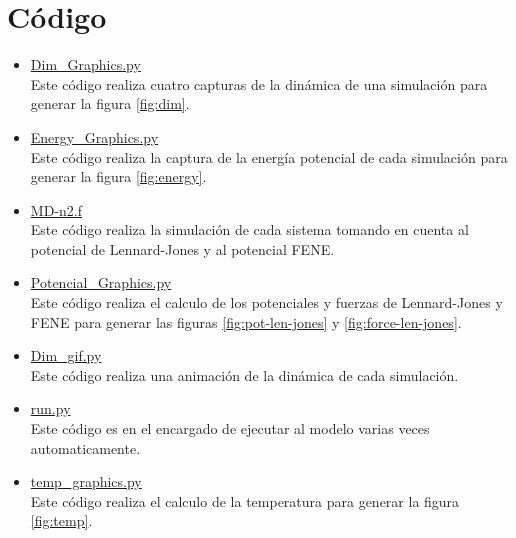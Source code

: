 \section{Código}
\begin{itemize}
    \item \href{https://github.com/giovannilopez9808/Notas_Agosto_2020/blob/master/Simulaciones/Proyecto_4/Scripts/Dim_Graphics.py}{Dim\_Graphics.py}\\
    Este código realiza cuatro capturas de la dinámica de una simulación para generar la figura \ref{fig:dim}.
    \item \href{https://github.com/giovannilopez9808/Notas_Agosto_2020/blob/master/Simulaciones/Proyecto_4/Scripts/Energy_Graphics.py}{Energy\_Graphics.py}\\
    Este código realiza la captura de la energía potencial de cada simulación para generar la figura \ref{fig:energy}.
    \item \href{https://github.com/giovannilopez9808/Notas_Agosto_2020/blob/master/Simulaciones/Proyecto_4/Scripts/MD-n2.f}{MD-n2.f}\\
    Este código realiza la simulación de cada sistema tomando en cuenta al potencial de Lennard-Jones y al potencial FENE.
    \item \href{https://github.com/giovannilopez9808/Notas_Agosto_2020/blob/master/Simulaciones/Proyecto_4/Scripts/Potencial_Graphics.py}{Potencial\_Graphics.py}\\
    Este código realiza el calculo de los potenciales y fuerzas de Lennard-Jones y FENE para generar las figuras \ref{fig:pot-len-jones} y \ref{fig:force-len-jones}.
    \item \href{https://github.com/giovannilopez9808/Notas_Agosto_2020/blob/master/Simulaciones/Proyecto_4/Scripts/dim_gif.py}{Dim\_gif.py}\\
    Este código realiza una animación de la dinámica de cada simulación.
    \item \href{https://github.com/giovannilopez9808/Notas_Agosto_2020/blob/master/Simulaciones/Proyecto_4/Scripts/run.py}{run.py}\\
    Este código es en el encargado de ejecutar al modelo varias veces automaticamente.
    \item \href{https://github.com/giovannilopez9808/Notas_Agosto_2020/blob/master/Simulaciones/Proyecto_4/Scripts/temp_graphics.py}{temp\_graphics.py}\\
    Este código realiza el calculo de la temperatura para generar la figura \ref{fig:temp}.
\end{itemize}